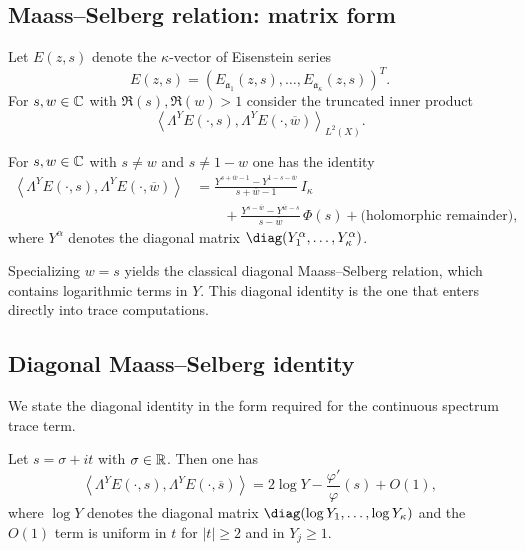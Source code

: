 \subsection{Maass--Selberg relation: matrix form}
\label{subsec:K.ms.matrix}

Let $E(z,s)$ denote the $\kappa$-vector of Eisenstein series
\[
E(z,s)=(E_{\mathfrak{a}_1}(z,s),\dots,E_{\mathfrak{a}_\kappa}(z,s))^T.
\]
For $s,w\in\mathbb{C}$ with $\Re(s),\Re(w)>1$ consider the truncated inner product
\[
\left\langle \Lambda^Y E(\cdot,s),\Lambda^Y E(\cdot,\overline{w})\right\rangle_{L^2(X)}.
\]

\begin{theorem}
\label{thm:K.maass.selberg}
For $s,w\in\mathbb{C}$ with $s\neq w$ and $s\neq 1-w$ one has the identity
\begin{align}
\label{eq:K.ms.relation}
\left\langle \Lambda^Y E(\cdot,s),\Lambda^Y E(\cdot,\overline{w})\right\rangle
&=
\frac{Y^{s+\overline{w}-1}-Y^{1-s-\overline{w}}}{s+\overline{w}-1}\,I_\kappa
\\
\nonumber
&\qquad
+
\frac{Y^{s-\overline{w}}-Y^{\overline{w}-s}}{s-\overline{w}}\,\Phi(s)
+
\text{(holomorphic remainder)},
\end{align}
where $Y^\alpha$ denotes the diagonal matrix $\diag(Y_1^\alpha,\dots,Y_\kappa^\alpha)$.
\end{theorem}

\begin{remark}
\label{rem:K.ms.diagonal}
Specializing $w=s$ yields the classical diagonal Maass--Selberg relation, which contains logarithmic terms in $Y$.
This diagonal identity is the one that enters directly into trace computations.
\end{remark}

\subsection{Diagonal Maass--Selberg identity}
\label{subsec:K.ms.diagonal}

We state the diagonal identity in the form required for the continuous spectrum trace term.

\begin{theorem}
\label{thm:K.ms.diagonal}
Let $s=\sigma+it$ with $\sigma\in\mathbb{R}$.
Then one has
\begin{equation}\label{eq:K.ms.diagonal}
\left\langle \Lambda^Y E(\cdot,s),\Lambda^Y E(\cdot,\overline{s})\right\rangle
=
2\log Y
-
\frac{\varphi'}{\varphi}(s)
+
O(1),
\end{equation}
where $\log Y$ denotes the diagonal matrix $\diag(\log Y_1,\dots,\log Y_\kappa)$ and the $O(1)$ term is uniform in $t$
for $|t|\ge 2$ and in $Y_j\ge 1$.
\end{theorem}

